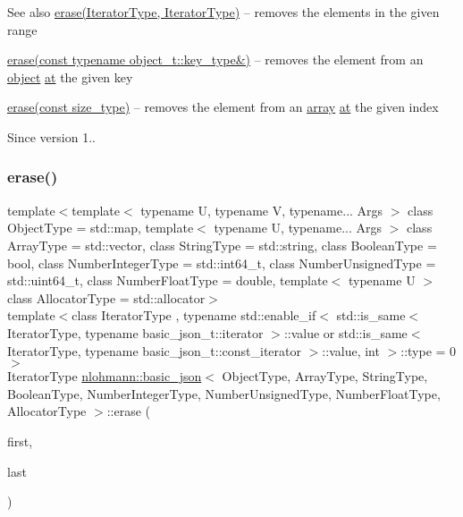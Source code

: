 \begin{DoxySeeAlso}{See also}
\hyperlink{classnlohmann_1_1basic__json_aa8996e3f8cd3e5113dcc3cb34bef7c0a}{erase(\+Iterator\+Type, Iterator\+Type)} -- removes the elements in the given range 

\hyperlink{classnlohmann_1_1basic__json_aa36e72ffc3241b960fe9186d19e03bc3}{erase(const typename object\+\_\+t\+::key\+\_\+type\&)} -- removes the element from an \hyperlink{classnlohmann_1_1basic__json_ad25b2f8c21e241e2d63455537a9294ff}{object} \hyperlink{classnlohmann_1_1basic__json_a214a8c22d616fd3567b88932c07436c9}{at} the given key 

\hyperlink{classnlohmann_1_1basic__json_a3da254c422ede5495f2815c5e48c00c5}{erase(const size\+\_\+type)} -- removes the element from an \hyperlink{classnlohmann_1_1basic__json_a5685815624b086caa532f41e853d4b0f}{array} \hyperlink{classnlohmann_1_1basic__json_a214a8c22d616fd3567b88932c07436c9}{at} the given index
\end{DoxySeeAlso}
\begin{DoxySince}{Since}
version 1.. 
\end{DoxySince}
\hypertarget{classnlohmann_1_1basic__json_aa8996e3f8cd3e5113dcc3cb34bef7c0a}{}\label{classnlohmann_1_1basic__json_aa8996e3f8cd3e5113dcc3cb34bef7c0a} 
\subsubsection{\texorpdfstring{erase()}{erase()}\hspace{0.1cm}{\footnotesize\ttfamily [2/4]}}
{\footnotesize\ttfamily template$<$template$<$ typename U, typename V, typename... Args $>$ class Object\+Type = std\+::map, template$<$ typename U, typename... Args $>$ class Array\+Type = std\+::vector, class String\+Type  = std\+::string, class Boolean\+Type  = bool, class Number\+Integer\+Type  = std\+::int64\+\_\+t, class Number\+Unsigned\+Type  = std\+::uint64\+\_\+t, class Number\+Float\+Type  = double, template$<$ typename U $>$ class Allocator\+Type = std\+::allocator$>$ \\
template$<$class Iterator\+Type , typename std\+::enable\+\_\+if$<$ std\+::is\+\_\+same$<$ Iterator\+Type, typename basic\+\_\+json\+\_\+t\+::iterator $>$\+::value or std\+::is\+\_\+same$<$ Iterator\+Type, typename basic\+\_\+json\+\_\+t\+::const\+\_\+iterator $>$\+::value, int $>$\+::type  = 0$>$ \\
Iterator\+Type \hyperlink{classnlohmann_1_1basic__json}{nlohmann\+::basic\+\_\+json}$<$ Object\+Type, Array\+Type, String\+Type, Boolean\+Type, Number\+Integer\+Type, Number\+Unsigned\+Type, Number\+Float\+Type, Allocator\+Type $>$\+::erase (\begin{DoxyParamCaption}\item[{Iterator\+Type}]{first,  }\item[{Iterator\+Type}]{last }\end{DoxyParamCaption})\hspace{0.3cm}{\ttfamily [inline]}}




